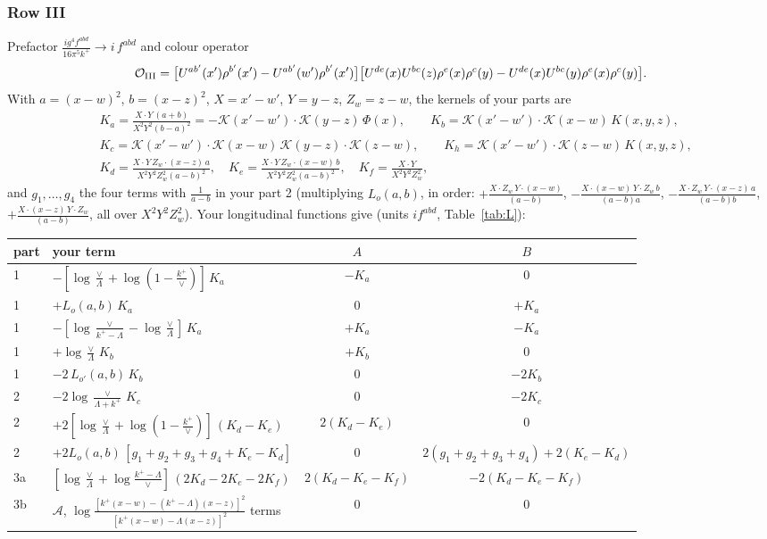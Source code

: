 \documentclass[10pt]{article}
\numberwithin{equation}{section}
\newcommand{\KK}{\mathcal K}
\begin{document}
\subsubsection{Row III}\label{sec:I.III}
Prefactor $\frac{ig^4f^{abd}}{16\pi^5k^+}\to i\,f^{abd}$ and colour operator
\[
\mathcal O_{\rm III}=\big[U^{ab'}(x')\rho^{b'}(x')-U^{ab'}(w')\rho^{b'}(x')\big]\big[U^{de}(x)U^{bc}(z)\rho^e(x)\rho^c(y)-U^{de}(x)U^{bc}(y)\rho^e(x)\rho^c(y)\big].
\]
With $a=(x-w)^2$, $b=(x-z)^2$, $X=x'-w'$, $Y=y-z$, $Z_w=z-w$, the kernels of your parts are
\begin{align*}
&K_a=\frac{X\cdot Y\,(a+b)}{X^2Y^2(b-a)^2}=-\KK(x'-w')\cdot\KK(y-z)\,\Phi(x),\qquad K_b=\KK(x'-w')\cdot\KK(x-w)\,K(x,y,z),\\
&K_c=\KK(x'-w')\cdot\KK(x-w)\,\KK(y-z)\cdot\KK(z-w),\qquad K_h=\KK(x'-w')\cdot\KK(z-w)\,K(x,y,z),\\
&K_d=\frac{X\cdot Y\,Z_w\cdot(x-z)\,a}{X^2Y^2Z_w^2(a-b)^2},\quad K_e=\frac{X\cdot Y\,Z_w\cdot(x-w)\,b}{X^2Y^2Z_w^2(a-b)^2},\quad K_f=\frac{X\cdot Y}{X^2Y^2Z_w^2},
\end{align*}
and $g_1,\dots,g_4$ the four terms with $\frac1{a-b}$ in your part 2 (multiplying $L_o(a,b)$, in order: $+\frac{X\cdot Z_w\,Y\cdot(x-w)}{(a-b)}$, $-\frac{X\cdot(x-w)\,Y\cdot Z_w\,b}{(a-b)a}$, $-\frac{X\cdot Z_w\,Y\cdot(x-z)\,a}{(a-b)b}$, $+\frac{X\cdot(x-z)\,Y\cdot Z_w}{(a-b)}$, all over $X^2Y^2Z_w^2$). Your longitudinal functions give (units $i f^{abd}$, Table~\ref{tab:L}):
\begin{center}\small
\begin{tabular}{@{}l l c c@{}}
part & your term & $A$ & $B$\\ \hline
1 & $-[\log\frac{\vee}{\Lambda}+\log(1-\frac{k^+}{\vee})]\,K_a$ & $-K_a$ & 0\\
1 & $+L_o(a,b)\,K_a$ & 0 & $+K_a$\\
1 & $-[\log\frac{\vee}{k^+-\Lambda}-\log\frac{\vee}{\Lambda}]\,K_a$ & $+K_a$ & $-K_a$\\
1 & $+\log\frac{\vee}{\Lambda}\,K_b$ & $+K_b$ & 0\\
1 & $-2\,L_{o'}(a,b)\,K_b$ & 0 & $-2K_b$\\
2 & $-2\log\frac{\vee}{\Lambda+k^+}\,K_c$ & 0 & $-2K_c$\\
2 & $+2[\log\frac{\vee}{\Lambda}+\log(1-\frac{k^+}{\vee})]\,(K_d-K_e)$ & $2(K_d-K_e)$ & 0\\
2 & $+2L_o(a,b)\,[g_1+g_2+g_3+g_4+K_e-K_d]$ & 0 & $2(g_1+g_2+g_3+g_4)+2(K_e-K_d)$\\
3a & $[\log\frac{\vee}{\Lambda}+\log\frac{k^+-\Lambda}{\vee}]\,(2K_d-2K_e-2K_f)$ & $2(K_d-K_e-K_f)$ & $-2(K_d-K_e-K_f)$\\
3b & $\mathcal A$, $\log\frac{[k^+(x-w)-(k^+-\Lambda)(x-z)]^2}{[k^+(x-w)-\Lambda(x-z)]^2}$ terms & 0 & 0\\
\end{tabular}
\end{center}
\end{document}

